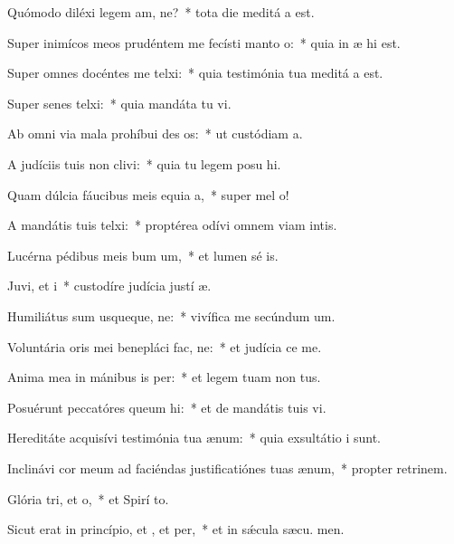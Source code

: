 \item Quómodo diléxi legem am, ne?~* tota die meditá a est.
\item Super inimícos meos prudéntem me fecísti manto o:~* quia in æ hi est.
\item Super omnes docéntes me telxi:~* quia testimónia tua meditá a est.
\item Super senes telxi:~* quia mandáta tu vi.
\item Ab omni via mala prohíbui des os:~* ut custódiam  a.
\item A judíciis tuis non clivi:~* quia tu legem posu hi.
\item Quam dúlcia fáucibus meis equia a,~* super mel  o!
\item A mandátis tuis telxi:~* proptérea odívi omnem viam intis.
\item Lucérna pédibus meis bum um,~* et lumen sé is.
\item Juvi, et i~* custodíre judícia justí æ.
\item Humiliátus sum usqueque, ne:~* vivífica me secúndum  um.
\item Voluntária oris mei benepláci fac, ne:~* et judícia  ce me.
\item Anima mea in mánibus is per:~* et legem tuam non  tus.
\item Posuérunt peccatóres queum hi:~* et de mandátis tuis  vi.
\item Hereditáte acquisívi testimónia tua  ænum:~* quia exsultátio  i sunt.
\item Inclinávi cor meum ad faciéndas justificatiónes tuas  ænum,~* propter retrinem.
\item Glória tri, et o,~* et Spirí to.
\item Sicut erat in princípio, et , et per,~* et in sǽcula sæcu. men.
